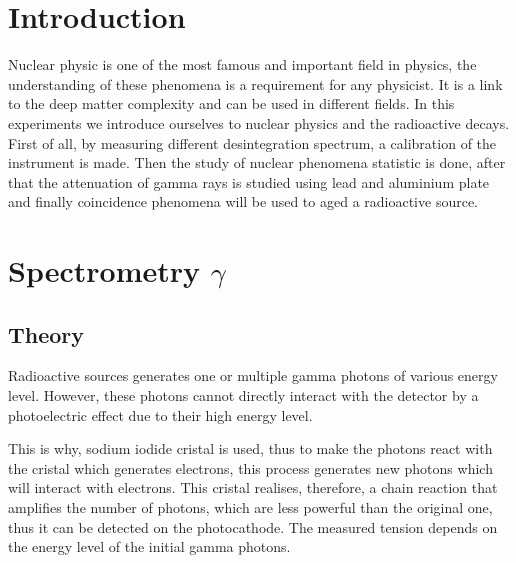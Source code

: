 \documentclass[a4paper,12pt,oneside]{article}
\begin{document}
\title{}
\author{Laurent Rohrbasser \& Tim Tuuva}

\maketitle
\tableofcontents
\baselineskip=16pt
\parindent=15pt
\parskip=5pt

\begin{abstract}
\end{abstract}

\section{Introduction}
Nuclear physic is one of the most famous and important field in physics, the understanding of these phenomena is a requirement for any physicist. It is a link to the deep matter complexity and can be used in different fields. In this experiments we introduce ourselves to nuclear physics and the radioactive decays. First of all, by measuring different desintegration spectrum, a calibration of the instrument is made. Then the study of nuclear phenomena statistic is done, after that the attenuation of gamma rays is studied using lead and aluminium plate and finally coincidence phenomena will be used to aged a radioactive source.

\section{Spectrometry $\gamma$}
\subsection{Theory}
Radioactive sources generates one or multiple gamma photons of various 
energy level. However, these photons cannot directly interact with the
 detector by a photoelectric effect due to their high energy level. 

This is why, sodium iodide cristal is used, thus to make the 
photons react with the cristal which generates electrons, this 
process generates new photons which will interact with electrons. 
This cristal realises, therefore, a chain reaction that amplifies the 
number of photons, which are less powerful than the original one, 
thus it can be detected on the photocathode. The measured tension 
depends on the energy level of the initial gamma photons.
\end{document}
